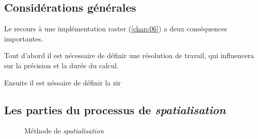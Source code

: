 \subsection{Considérations générales}

Le recours à une implémentation raster (\autoref{chap:06}) a deux conséquences importantes. 

Tout d'abord il est nécessaire de définir une résolution de travail, qui influencera sur la précision et la durée du calcul.

Ensuite il est néssaire de définir la \ac{zir}


\subsection{Les parties du processus de \emph{spatialisation}}



\begin{figure}
  \centering
  
  \caption{Méthode de \emph{spatialisation}}
  \label{fig:methodo_spatialisation}
\end{figure}
